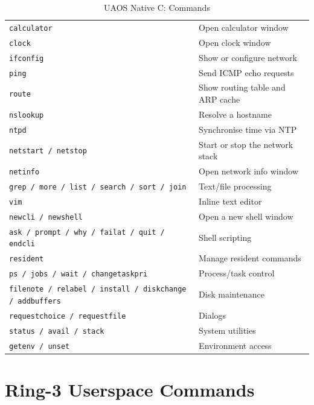 \documentclass[11pt,a4paper]{report}
\begin{document}
\begin{table}[h]
\begin{tabular}{ll}
        \texttt{calculator} & Open calculator window \\
        \texttt{clock} & Open clock window \\
        \texttt{ifconfig} & Show or configure network \\
        \texttt{ping} & Send ICMP echo requests \\
        \texttt{route} & Show routing table and ARP cache \\
        \texttt{nslookup} & Resolve a hostname \\
        \texttt{ntpd} & Synchronise time via NTP \\
        \texttt{netstart / netstop} & Start or stop the network stack \\
        \texttt{netinfo} & Open network info window \\
        \texttt{grep / more / list / search / sort / join} & Text/file processing \\
        \texttt{vim} & Inline text editor \\
        \texttt{newcli / newshell} & Open a new shell window \\
        \texttt{ask / prompt / why / failat / quit / endcli} & Shell scripting \\
        \texttt{resident} & Manage resident commands \\
        \texttt{ps / jobs / wait / changetaskpri} & Process/task control \\
        \texttt{filenote / relabel / install / diskchange / addbuffers} & Disk maintenance \\
        \texttt{requestchoice / requestfile} & Dialogs \\
        \texttt{status / avail / stack} & System utilities \\
        \texttt{getenv / unset} & Environment access \\
        \bottomrule
    \end{tabular}
    \caption{UAOS Native C: Commands}
    \label{tab:nativecmds}
\end{table}

\section{Ring-3 Userspace Commands}
\end{document}
